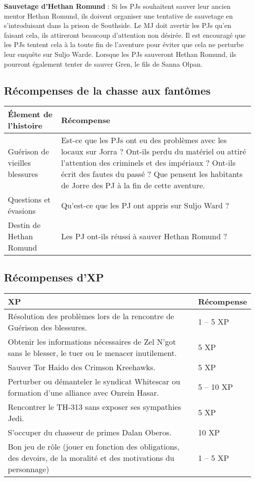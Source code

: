\documentclass[twoside]{article}
\begin{document}
\textbf{Sauvetage d'Hethan Romund} : Si les PJs souhaitent sauver leur ancien mentor Hethan Romund, ils doivent organiser une tentative de sauvetage en s'introduisant dans la prison de Southside. Le MJ doit avertir les PJs qu'en faisant cela, ils attireront beaucoup d'attention non désirée. Il est encouragé que les PJs tentent cela à la toute fin de l'aventure pour éviter que cela ne perturbe leur enquête sur Suljo Warde.  Lorsque les PJs sauveront Hethan Romund, ils pourront également tenter de sauver Gren, le fils de Sanna Olpan.\\


\subsection{Récompenses de la chasse aux fantômes}
\renewcommand{\arraystretch}{1.4}
\begin{tabular}{|p{4.5cm}|p{12cm}|}
	\hline 
	\cellcolor{DarkRed} {\large \textcolor{PureWhite}{\textbf{Élement de l'histoire}}} & \cellcolor{DarkRed} {\large \textcolor{PureWhite}{\textbf{Récompense}}} \\ 
	\hline 
	Guérison de vieilles blessures & Est-ce que les PJs ont eu des problèmes avec les locaux sur Jorra ? Ont-ils perdu du matériel ou attiré l'attention des criminels et des impériaux ?  Ont-ils écrit des fautes du passé ? Que pensent les habitants de Jorre des PJ à la fin de cette aventure. \\ 
	\hline 
	Questions et évasions & Qu'est-ce que les PJ ont appris sur Suljo Ward ? \\ 
	\hline 
	Destin de Hethan Romund & Les PJ ont-ils réussi à sauver Hethan Romund ? \\ 
	\hline 
\end{tabular} 

\subsection{Récompenses d'XP}
\begin{tabular}{|p{12cm}|p{4cm}|}
	\hline 
	\cellcolor{DarkRed} {\large \textcolor{PureWhite}{\textbf{XP}}} & \cellcolor{DarkRed} {\large \textcolor{PureWhite}{\textbf{Récompense}}} \\ 
	\hline 
	Résolution des problèmes lors de la rencontre de Guérison des blessures. & 1 -- 5 XP \\ 
	\hline 
	Obtenir les informations nécessaires de Zel N'got sans le blesser, le tuer ou le menacer inutilement. & 5 XP \\ 
	\hline 
	Sauver Tor Haido des Crimson Kreehawks. & 5 XP \\
	\hline 
	Perturber ou démanteler le syndicat Whitescar ou formation d'une alliance avec Onrein Hasar. & 5 -- 10 XP \\
	\hline 
	Rencontrer le TH-313 sans exposer ses sympathies Jedi. & 5 XP \\
	\hline 
	S'occuper du chasseur de primes Dalan Oberos. & 10 XP \\
	\hline 
	Bon jeu de rôle (jouer en fonction des obligations, des devoirs, de la moralité et des motivations du personnage) & 1 -- 5 XP \\
	\hline 
\end{tabular}
\end{document}
